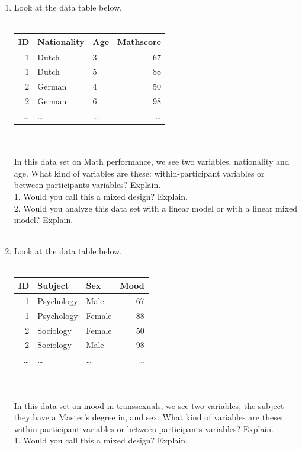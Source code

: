 \documentclass[]{report}\usepackage[]{graphicx}\usepackage[]{color}
\begin{document}
\begin{enumerate}
\\
\item Look at the data table below.
\\
 \\
 \begin{tabular}{rllr}
  ID & Nationality & Age & Mathscore  \\ \hline
  1   & Dutch      &  3 & 67   \\
 1   &  Dutch     &  5 & 88   \\
 2    & German         &  4 & 50   \\
 2   &  German        &  6 & 98  \\
  \dots   & \dots        &  \dots& \dots  \\
 \end{tabular}
\\
\\
In this data set on Math performance, we see two variables, nationality and age. What kind of variables are these: within-participant variables or between-participants variables? Explain.\\
1. Would you call this a mixed design? Explain.\\
2. Would you analyze this data set with a linear model or with a linear mixed model? Explain.
\\
\\
\item Look at the data table below.
\\
 \\
 \begin{tabular}{rllr}
  ID & Subject & Sex & Mood  \\ \hline
  1   & Psychology      &  Male & 67   \\
 1   &  Psychology     &  Female & 88   \\
 2    & Sociology         &  Female & 50   \\
 2   &  Sociology        &  Male & 98  \\
  \dots   & \dots        &  \dots& \dots  \\
 \end{tabular}
\\
\\
In this data set on mood in transsexuals, we see two variables, the subject they have a Master's degree in, and sex. What kind of variables are these: within-participant variables or between-participants variables? Explain.\\
1. Would you call this a mixed design? Explain.\\

\end{enumerate}
\end{document}
